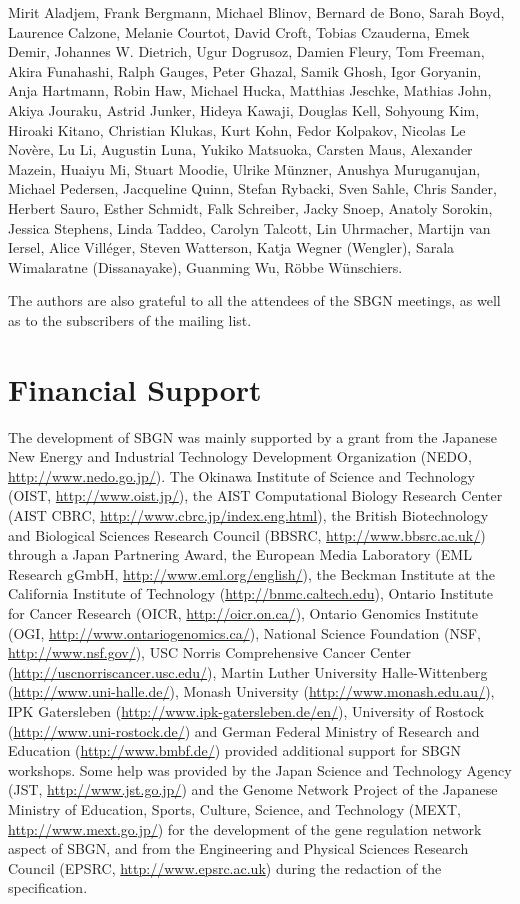 Mirit Aladjem, Frank Bergmann, Michael Blinov, Bernard de Bono, Sarah Boyd, Laurence Calzone, Melanie Courtot, David Croft, Tobias Czauderna, Emek Demir, Johannes W. Dietrich, Ugur Dogrusoz, Damien Fleury, Tom Freeman, Akira Funahashi, Ralph Gauges, Peter Ghazal, Samik Ghosh, Igor Goryanin, Anja Hartmann, Robin Haw, Michael Hucka, Matthias Jeschke, Mathias John, Akiya Jouraku, Astrid Junker, Hideya Kawaji, Douglas Kell, Sohyoung Kim, Hiroaki Kitano, Christian Klukas, Kurt Kohn, Fedor Kolpakov, Nicolas Le Nov\`{e}re, Lu Li, Augustin Luna, Yukiko Matsuoka, Carsten Maus, Alexander Mazein, Huaiyu Mi, Stuart Moodie, Ulrike M\"unzner, Anushya Muruganujan, Michael Pedersen, Jacqueline Quinn, Stefan Rybacki, Sven Sahle, Chris Sander, Herbert Sauro, Esther Schmidt, Falk Schreiber, Jacky Snoep, Anatoly Sorokin, Jessica Stephens, Linda Taddeo, Carolyn Talcott, Lin Uhrmacher, Martijn van Iersel, Alice Vill\'{e}ger, Steven Watterson, Katja Wegner (Wengler), Sarala Wimalaratne (Dissanayake), Guanming Wu, R\"obbe W\"unschiers.

The authors are also grateful to all the attendees of the SBGN meetings, as 
well as to the subscribers of the  mailing list.


\section{Financial Support}

The development of SBGN was mainly supported by a grant from the Japanese New Energy and Industrial Technology Development Organization (NEDO, \url{http://www.nedo.go.jp/}). 
The Okinawa Institute of Science and Technology (OIST, \url{http://www.oist.jp/}), 
the AIST Computational Biology Research Center (AIST CBRC, \url{http://www.cbrc.jp/index.eng.html}), 
the British Biotechnology and Biological Sciences Research Council (BBSRC, \url{http://www.bbsrc.ac.uk/}) through a Japan Partnering Award, 
the European Media Laboratory (EML Research gGmbH, \url{http://www.eml.org/english/}), 
the Beckman Institute at the California Institute of Technology (\url{http://bnmc.caltech.edu}), 
Ontario Institute for Cancer Research (OICR, \url{http://oicr.on.ca/}), 
Ontario Genomics Institute (OGI, \url{http://www.ontariogenomics.ca/}), 
National Science Foundation (NSF, \url{http://www.nsf.gov/}), 
USC Norris Comprehensive Cancer Center (\url{http://uscnorriscancer.usc.edu/}), 
Martin Luther University Halle-Wittenberg (\url{http://www.uni-halle.de/}), 
Monash University (\url{http://www.monash.edu.au/}), 
IPK Gatersleben (\url{http://www.ipk-gatersleben.de/en/}), 
University of Rostock (\url{http://www.uni-rostock.de/})  and 
German Federal Ministry of Research and Education (\url{http://www.bmbf.de/}) provided additional support for SBGN workshops. 
Some help was provided by the Japan Science and Technology Agency (JST, \url{http://www.jst.go.jp/}) and the Genome Network Project of the Japanese Ministry of Education, Sports, Culture, Science, and Technology (MEXT, \url{http://www.mext.go.jp/}) for the development of the gene regulation network aspect of SBGN, and from the Engineering and Physical Sciences Research Council (EPSRC, \url{http://www.epsrc.ac.uk}) during the redaction of the specification.


